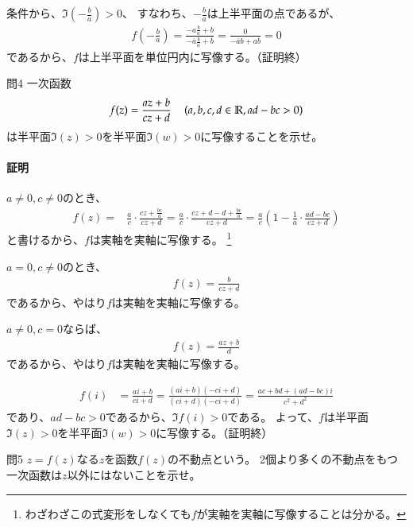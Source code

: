 条件から、$\Im\left(-\frac{b}{a}\right)>0$、
すなわち、$-\frac{b}{a}$は上半平面の点であるが、
\begin{align*}
    f\left(-\frac{b}{a}\right)
    =\frac{-a\frac{b}{a}+b}{-\overline{a}\frac{b}{a}+\overline{b}}
    =\frac{0}{-\overline{a}b+a\overline{b}}
    =0
\end{align*}
であるから、$f$は上半平面を単位円内に写像する。（証明終）

\newpage
\begin{mysimplebox}{問4}
    一次函数
    \begin{align*}
        f(z)=\frac{az+b}{cz+d}
        \quad\left(a,b,c,d\in\mathbb{R},ad-bc>0\right)
    \end{align*}
    は半平面$\Im(z)>0$を半平面$\Im(w)>0$に写像することを示せ。
\end{mysimplebox}
\paragraph{証明}
$a\neq0,c\neq0$のとき、
\begin{align*}
    f(z)=&\frac{a}{c}\cdot\frac{cz+\frac{bc}{a}}{cz+d}
    =\frac{a}{c}\cdot\frac{cz+d-d+\frac{bc}{a}}{cz+d}
    =\frac{a}{c}\left(1-\frac{1}{a}\cdot\frac{ad-bc}{cz+d}\right)
\end{align*}
と書けるから、$f$は実軸を実軸に写像する。
\footnote{わざわざこの式変形をしなくても$f$が実軸を実軸に写像することは分かる。}

$a=0,c\neq0$のとき、
\begin{align*}
    f(z)=\frac{b}{cz+d}
\end{align*}
であるから、やはり$f$は実軸を実軸に写像する。

$a\neq0,c=0$ならば、
\begin{align*}
    f(z)=\frac{az+b}{d}
\end{align*}
であるから、やはり$f$は実軸を実軸に写像する。

\begin{align*}
    f(i)&=\frac{ai+b}{ci+d}
    =\frac{(ai+b)(-ci+d)}{(ci+d)(-ci+d)}
    =\frac{ac+bd+(ad-bc)i}{c^2+d^2}
\end{align*}
であり、$ad-bc>0$であるから、$\Im f(i)>0$である。
よって、$f$は半平面$\Im(z)>0$を半平面$\Im(w)>0$に写像する。（証明終）

\newpage
\begin{mysimplebox}{問5}
    $z=f(z)$なる$z$を函数$f(z)$の不動点という。
    2個より多くの不動点をもつ一次函数は$z$以外にはないことを示せ。
\end{mysimplebox}
